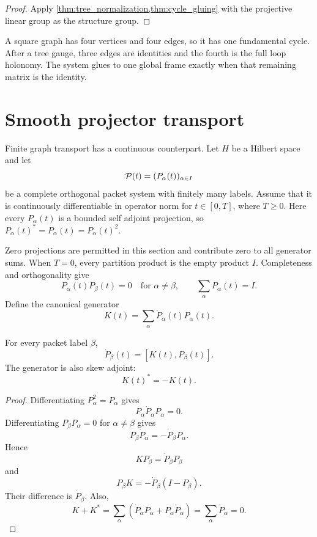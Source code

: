\begin{proof}
Apply \cref{thm:tree_normalization,thm:cycle_gluing} with the projective linear group as the structure group.
\end{proof}

\begin{example}\label{ex:square_loop}
A square graph has four vertices and four edges, so it has one fundamental cycle.  After a tree gauge, three edges are identities and the fourth is the full loop holonomy.  The system glues to one global frame exactly when that remaining matrix is the identity.
\end{example}

\section{Smooth projector transport}\label{sec:kato_transport}

Finite graph transport has a continuous counterpart.  Let $H$ be a Hilbert space and let
\[
\mathcal P(t)=(P_\alpha(t))_{\alpha\in I}
\]
be a complete orthogonal packet system with finitely many labels. Assume that it is continuously differentiable in operator norm for $t\in[0,T]$, where $T\ge0$. Here every $P_\alpha(t)$ is a bounded self adjoint projection, so $P_\alpha(t)^*=P_\alpha(t)=P_\alpha(t)^2$.

Zero projections are permitted in this section and contribute zero to all generator sums. When $T=0$, every partition product is the empty product $I$. Completeness and orthogonality give
\[
P_\alpha(t)P_\beta(t)=0
\quad\text{for }\alpha\ne\beta,
\qquad
\sum_\alpha P_\alpha(t)=I.
\]
Define the canonical generator
\[
K(t)=\sum_\alpha \dot P_\alpha(t)P_\alpha(t).
\]

\begingroup
\setlength{\abovedisplayskip}{6pt plus 2pt minus 2pt}
\setlength{\belowdisplayskip}{6pt plus 2pt minus 2pt}
\begin{lemma}\label{lem:packet_commutator}
For every packet label $\beta$,
\[
\dot P_\beta(t)=[K(t),P_\beta(t)].
\]
The generator is also skew adjoint:
\[
K(t)^*=-K(t).
\]
\end{lemma}

\begin{proof}
Differentiating $P_\alpha^2=P_\alpha$ gives
\[
P_\alpha\dot P_\alpha P_\alpha=0.
\]
Differentiating $P_\beta P_\alpha=0$ for $\alpha\ne\beta$ gives
\[
P_\beta\dot P_\alpha=-\dot P_\beta P_\alpha.
\]
Hence
\[
K P_\beta=\dot P_\beta P_\beta
\]
and
\[
P_\beta K=-\dot P_\beta(I-P_\beta).
\]
Their difference is $\dot P_\beta$.  Also,
\[
K+K^*
=
\sum_\alpha(\dot P_\alpha P_\alpha+P_\alpha\dot P_\alpha)
=
\sum_\alpha\dot P_\alpha
=0.
\]
\end{proof}
\endgroup

